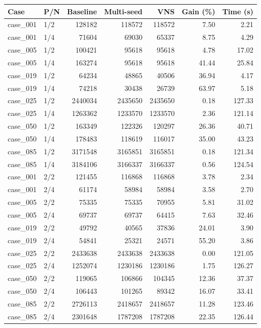 \begin{tabular}{llrrrrr}
\toprule
Case & P/N & Baseline & Multi-seed & VNS & Gain (\%) & Time (s) \\
\midrule
case\_001 & 1/2 & 128182 & 118572 & 118572 & 7.50 & 2.21 \\
case\_001 & 1/4 & 71604 & 69030 & 65337 & 8.75 & 4.29 \\
case\_005 & 1/2 & 100421 & 95618 & 95618 & 4.78 & 17.02 \\
case\_005 & 1/4 & 163274 & 95618 & 95618 & 41.44 & 25.84 \\
case\_019 & 1/2 & 64234 & 48865 & 40506 & 36.94 & 4.17 \\
case\_019 & 1/4 & 74218 & 30438 & 26739 & 63.97 & 5.18 \\
case\_025 & 1/2 & 2440034 & 2435650 & 2435650 & 0.18 & 127.33 \\
case\_025 & 1/4 & 1263362 & 1233570 & 1233570 & 2.36 & 121.14 \\
case\_050 & 1/2 & 163349 & 122326 & 120297 & 26.36 & 40.71 \\
case\_050 & 1/4 & 178483 & 118619 & 116017 & 35.00 & 43.23 \\
case\_085 & 1/2 & 3171548 & 3165851 & 3165851 & 0.18 & 121.34 \\
case\_085 & 1/4 & 3184106 & 3166337 & 3166337 & 0.56 & 124.54 \\
case\_001 & 2/2 & 121455 & 116868 & 116868 & 3.78 & 2.34 \\
case\_001 & 2/4 & 61174 & 58984 & 58984 & 3.58 & 2.70 \\
case\_005 & 2/2 & 75335 & 75335 & 70955 & 5.81 & 31.02 \\
case\_005 & 2/4 & 69737 & 69737 & 64415 & 7.63 & 32.46 \\
case\_019 & 2/2 & 49792 & 40565 & 37836 & 24.01 & 3.90 \\
case\_019 & 2/4 & 54841 & 25321 & 24571 & 55.20 & 3.86 \\
case\_025 & 2/2 & 2433638 & 2433638 & 2433638 & 0.00 & 121.05 \\
case\_025 & 2/4 & 1252074 & 1230186 & 1230186 & 1.75 & 126.27 \\
case\_050 & 2/2 & 119065 & 106866 & 104345 & 12.36 & 37.37 \\
case\_050 & 2/4 & 106443 & 101265 & 89342 & 16.07 & 33.41 \\
case\_085 & 2/2 & 2726113 & 2418657 & 2418657 & 11.28 & 123.46 \\
case\_085 & 2/4 & 2301648 & 1787208 & 1787208 & 22.35 & 126.44 \\

\end{tabular}
